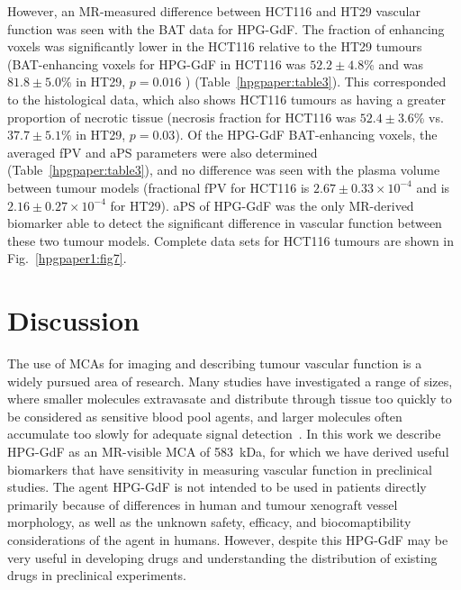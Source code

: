 However, an MR-measured difference between HCT116 and HT29 vascular function was seen with the \acs{BAT} data for \acs{HPG-GdF}.
The fraction of enhancing voxels was significantly lower in the HCT116 relative to the HT29 tumours (BAT-enhancing voxels for \acs{HPG-GdF} in HCT116 was $52.2\pm 4.8$\% and was $81.8\pm 5.0$\% in HT29, $p=0.016$ ) (Table~\ref{hpgpaper:table3}).
This corresponded to the histological data, which also shows HCT116 tumours as having a greater proportion of necrotic tissue (necrosis fraction for HCT116 was $52.4\pm 3.6$\% vs. $37.7\pm 5.1$\% in HT29, $p=0.03$).
Of the \acs{HPG-GdF} \acs{BAT}-enhancing voxels, the averaged \acs{fPV} and \acs{aPS} parameters were also determined (Table~\ref{hpgpaper:table3}), and no difference was seen with the plasma volume between tumour models (fractional \acs{fPV} for HCT116 is $2.67\pm 0.33\times10^{-4}$ and is $2.16\pm 0.27 \times10^{-4}$ for HT29).
\acs{aPS} of \acs{HPG-GdF} was the only MR-derived biomarker able to detect the significant difference in vascular function between these two tumour models.
Complete data sets for HCT116 tumours are shown in Fig.~\ref{hpgpaper1:fig7}.

\section{Discussion}

The use of \acs{MCA}s for imaging and describing tumour vascular function is a widely pursued area of research.
Many studies have investigated a range of sizes, where smaller molecules extravasate and distribute through tissue too quickly to be considered as sensitive blood pool agents, and larger molecules often accumulate too slowly for adequate signal detection~\cite{Kyle:2007ch,Tang:2013fi,Sourbron:2011ce}.
In this work we describe \acs{HPG-GdF} as an MR-visible \acs{MCA} of 583~\acs{kDa}, for which we have derived useful biomarkers that have sensitivity in measuring vascular function in preclinical studies.
The agent HPG-GdF is not intended to be used in patients directly primarily because of differences in human and tumour xenograft vessel morphology, as well as the unknown safety, efficacy, and biocomaptibility considerations of the agent in humans.
However, despite this \acs{HPG-GdF} may be very useful in developing drugs and understanding the distribution of existing drugs in preclinical experiments.

